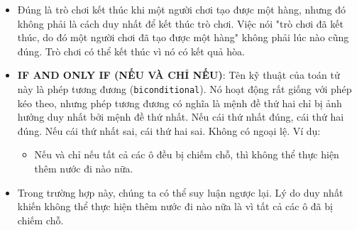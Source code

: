 \begin{itemize}
    \item Đúng là trò chơi kết thúc khi một người chơi tạo được một hàng, nhưng đó không phải là cách duy nhất để kết thúc trò chơi. Việc nói "trò chơi đã kết thúc, do đó một người chơi đã tạo được một hàng" không phải lúc nào cũng đúng. Trò chơi có thể kết thúc vì nó có kết quả hòa.

    \item \textbf{IF AND ONLY IF (NẾU VÀ CHỈ NẾU)}: Tên kỹ thuật của toán tử này là phép tương đương (\texttt{biconditional}). Nó hoạt động rất giống với phép kéo theo, nhưng phép tương đương có nghĩa là mệnh đề thứ hai chỉ bị ảnh hưởng duy nhất bởi mệnh đề thứ nhất. Nếu cái thứ nhất đúng, cái thứ hai đúng. Nếu cái thứ nhất sai, cái thứ hai sai. Không có ngoại lệ. Ví dụ:
    \begin{itemize}
        \item Nếu và chỉ nếu tất cả các ô đều bị chiếm chỗ, thì không thể thực hiện thêm nước đi nào nữa.
    \end{itemize}

    \item Trong trường hợp này, chúng ta có thể suy luận ngược lại. Lý do duy nhất khiến không thể thực hiện thêm nước đi nào nữa là vì tất cả các ô đã bị chiếm chỗ.
\end{itemize}

